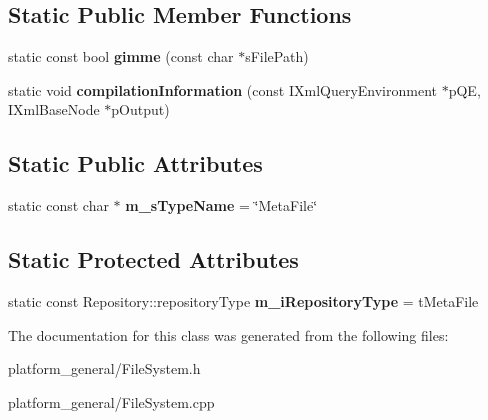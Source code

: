 \subsection*{\-Static \-Public \-Member \-Functions}
\begin{DoxyCompactItemize}
\item 
\hypertarget{classgeneral__server_1_1MetaFile_ae0bec55736314f55658c794b9baacd3b}{static const bool {\bfseries gimme} (const char $\ast$s\-File\-Path)}\label{classgeneral__server_1_1MetaFile_ae0bec55736314f55658c794b9baacd3b}

\item 
\hypertarget{classgeneral__server_1_1MetaFile_a0573a8eb7fb516597c6110ddd7b66311}{static void {\bfseries compilation\-Information} (const \-I\-Xml\-Query\-Environment $\ast$p\-Q\-E, \-I\-Xml\-Base\-Node $\ast$p\-Output)}\label{classgeneral__server_1_1MetaFile_a0573a8eb7fb516597c6110ddd7b66311}

\end{DoxyCompactItemize}
\subsection*{\-Static \-Public \-Attributes}
\begin{DoxyCompactItemize}
\item 
\hypertarget{classgeneral__server_1_1MetaFile_a74032b3eb2a643f2f89e3bf5b285dfae}{static const char $\ast$ {\bfseries m\-\_\-s\-Type\-Name} = \char`\"{}\-Meta\-File\char`\"{}}\label{classgeneral__server_1_1MetaFile_a74032b3eb2a643f2f89e3bf5b285dfae}

\end{DoxyCompactItemize}
\subsection*{\-Static \-Protected \-Attributes}
\begin{DoxyCompactItemize}
\item 
\hypertarget{classgeneral__server_1_1MetaFile_abf0c453970478b09ce2a5fba55dccf8e}{static const \*
\-Repository\-::repository\-Type {\bfseries m\-\_\-i\-Repository\-Type} = t\-Meta\-File}\label{classgeneral__server_1_1MetaFile_abf0c453970478b09ce2a5fba55dccf8e}

\end{DoxyCompactItemize}


\-The documentation for this class was generated from the following files\-:\begin{DoxyCompactItemize}
\item 
platform\-\_\-general/\-File\-System.\-h\item 
platform\-\_\-general/\-File\-System.\-cpp\end{DoxyCompactItemize}
